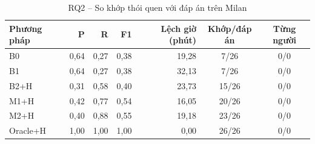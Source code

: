 \begin{table}[htbp]
\centering
\caption{RQ2 -- So khớp thói quen với đáp án trên Milan}
\label{tab:rq2-milan}
\small
\begin{tabular}{lrrrrcc}
\toprule
Phương pháp & P & R & F1 & Lệch giờ (phút) & Khớp/đáp án & Từng người \\
\midrule
B0 & 0{,}64 & 0{,}27 & 0{,}38 & 19{,}28 & 7/26 & 0/0 \\
B1 & 0{,}64 & 0{,}27 & 0{,}38 & 32{,}13 & 7/26 & 0/0 \\
B2+H & 0{,}31 & 0{,}58 & 0{,}40 & 23{,}73 & 15/26 & 0/0 \\
M1+H & 0{,}42 & 0{,}77 & 0{,}54 & 16{,}05 & 20/26 & 0/0 \\
M2+H & 0{,}40 & 0{,}88 & 0{,}55 & 19{,}18 & 23/26 & 0/0 \\
Oracle+H & 1{,}00 & 1{,}00 & 1{,}00 & 0{,}00 & 26/26 & 0/0 \\
\bottomrule
\end{tabular}
\end{table}
